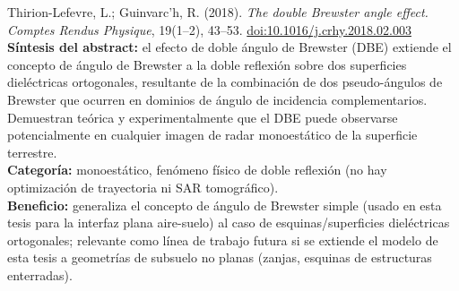 \documentclass[11pt,a4paper]{article}
\begin{document}
\begin{enumerate}[label=\textbf{[E\arabic*]}, leftmargin=2.2cm, itemsep=10pt]
\item Thirion-Lefevre, L.; Guinvarc'h, R. (2018). \textit{The double
Brewster angle effect.} \emph{Comptes Rendus Physique}, 19(1--2), 43--53.
\href{https://doi.org/10.1016/j.crhy.2018.02.003}{doi:10.1016/j.crhy.2018.02.003}
\cite{thirion2018}\\
\textbf{Síntesis del abstract:} el efecto de doble ángulo de Brewster (DBE)
extiende el concepto de ángulo de Brewster a la doble reflexión sobre dos
superficies dieléctricas ortogonales, resultante de la combinación de dos
pseudo-ángulos de Brewster que ocurren en dominios de ángulo de incidencia
complementarios. Demuestran teórica y experimentalmente que el DBE puede
observarse potencialmente en cualquier imagen de radar monoestático de la
superficie terrestre.\\
\textbf{Categoría:} monoestático, fenómeno físico de doble reflexión (no
hay optimización de trayectoria ni SAR tomográfico).\\
\textbf{Beneficio:} generaliza el concepto de ángulo de Brewster simple
(usado en esta tesis para la interfaz plana aire-suelo) al caso de
esquinas/superficies dieléctricas ortogonales; relevante como línea de
trabajo futura si se extiende el modelo de esta tesis a geometrías de
subsuelo no planas (zanjas, esquinas de estructuras enterradas).


\end{enumerate}
\end{document}
